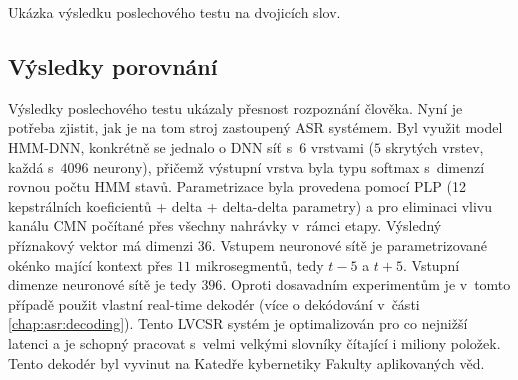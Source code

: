 \begin{table}[htpb]
  \centering
  \def\arraystretch{1.5}
  \caption{Ukázka výsledku poslechového testu na dvojicích slov.}
  \label{tab:realisation:listening:bigrams}
\end{table}

\subsection{Výsledky porovnání}
\label{chap:realisation:comparison}

Výsledky poslechového testu ukázaly přesnost rozpoznání člověka.
Nyní je potřeba zjistit, jak je na tom stroj zastoupený ASR systémem.
Byl využit model HMM-DNN, konkrétně se jednalo o DNN síť s~$6$ vrstvami ($5$ skrytých vrstev, každá s~$4096$ neurony), přičemž výstupní vrstva byla typu softmax s~dimenzí rovnou počtu HMM stavů.
Parametrizace byla provedena pomocí PLP (12 kepstrálních koeficientů + delta + delta-delta parametry) a pro eliminaci vlivu kanálu CMN počítané přes všechny nahrávky v~rámci etapy.
Výsledný příznakový vektor má dimenzi $36$.
Vstupem neuronové sítě je parametrizované okénko mající kontext přes $11$ mikrosegmentů, tedy $t-5$ a $t+5$.
Vstupní dimenze neuronové sítě je tedy $396$.
Oproti dosavadním experimentům je v~tomto případě použit vlastní real-time dekodér (více o dekódování v~části \ref{chap:asr:decoding}).
Tento LVCSR systém je optimalizován pro co nejnižší latenci a je schopný pracovat s~velmi velkými slovníky čítající i miliony položek.
Tento dekodér byl vyvinut na Katedře kybernetiky Fakulty aplikovaných věd.

